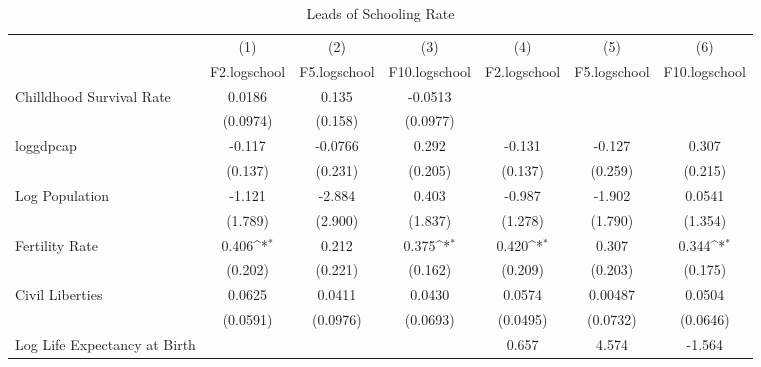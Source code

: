 \begin{table}[htbp]\centering
\def\sym#1{\ifmmode^{#1}\else\(^{#1}\)\fi}
\caption{Leads of Schooling Rate}
\begin{tabular}{l*{6}{c}}
\toprule
                &\multicolumn{1}{c}{(1)}&\multicolumn{1}{c}{(2)}&\multicolumn{1}{c}{(3)}&\multicolumn{1}{c}{(4)}&\multicolumn{1}{c}{(5)}&\multicolumn{1}{c}{(6)}\\
                &\multicolumn{1}{c}{F2.logschool}&\multicolumn{1}{c}{F5.logschool}&\multicolumn{1}{c}{F10.logschool}&\multicolumn{1}{c}{F2.logschool}&\multicolumn{1}{c}{F5.logschool}&\multicolumn{1}{c}{F10.logschool}\\
\midrule
Chilldhood Survival Rate&   0.0186         &    0.135         &  -0.0513         &                  &                  &                  \\
                & (0.0974)         &  (0.158)         & (0.0977)         &                  &                  &                  \\
\addlinespace
loggdpcap       &   -0.117         &  -0.0766         &    0.292         &   -0.131         &   -0.127         &    0.307         \\
                &  (0.137)         &  (0.231)         &  (0.205)         &  (0.137)         &  (0.259)         &  (0.215)         \\
\addlinespace
Log Population  &   -1.121         &   -2.884         &    0.403         &   -0.987         &   -1.902         &   0.0541         \\
                &  (1.789)         &  (2.900)         &  (1.837)         &  (1.278)         &  (1.790)         &  (1.354)         \\
\addlinespace
Fertility Rate  &    0.406\sym{*}  &    0.212         &    0.375\sym{*}  &    0.420\sym{*}  &    0.307         &    0.344\sym{*}  \\
                &  (0.202)         &  (0.221)         &  (0.162)         &  (0.209)         &  (0.203)         &  (0.175)         \\
\addlinespace
Civil Liberties &   0.0625         &   0.0411         &   0.0430         &   0.0574         &  0.00487         &   0.0504         \\
                & (0.0591)         & (0.0976)         & (0.0693)         & (0.0495)         & (0.0732)         & (0.0646)         \\
\addlinespace
Log Life Expectancy at Birth&                  &                  &                  &    0.657         &    4.574         &   -1.564         \\

\end{tabular}
\end{table}
